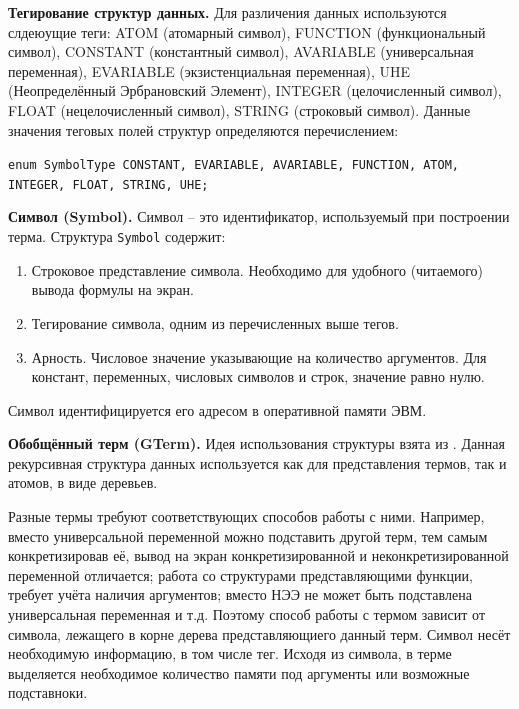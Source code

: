 
\textbf{Тегирование структур данных.} 
Для различения данных используются слдеюущие теги: ATOM (атомарный символ), FUNCTION (функциональный символ), CONSTANT (константный символ), AVARIABLE (универсальная переменная), EVARIABLE (экзистенциальная переменная), UHE (Неопределённый Эрбрановский Элемент), INTEGER (целочисленный символ), FLOAT (нецелочисленный символ), STRING (строковый символ). Данные значения теговых полей структур определяются перечислением:

{\tt enum SymbolType {CONSTANT, EVARIABLE, AVARIABLE, FUNCTION, ATOM, INTEGER, FLOAT, STRING, UHE};}

\textbf{Символ (Symbol).} 
Символ -- это идентификатор, используемый при построении терма. Структура \texttt{Symbol} содержит: 
\begin{enumerate}
\item Строковое представление символа. Необходимо для удобного (читаемого) вывода формулы на экран.
\item Тегирование символа, одним из перечисленных выше тегов. 
\item Арность. Числовое значение указывающие на количество аргументов. Для констант, переменных, числовых символов и строк, значение равно нулю.
\end{enumerate}

Символ идентифицируется его адресом в оперативной памяти ЭВМ.

\textbf{Обобщённый терм (GTerm).} 
Идея использования структуры взята из \cite{NNN}. Данная рекурсивная структура данных используется как для представления термов, так и атомов, в виде деревьев. 

Разные термы требуют соответствующих способов работы с ними. Например, вместо универсальной переменной можно подставить другой терм, тем самым конкретизировав её, вывод на экран конкретизированной и неконкретизированной переменной отличается; работа со структурами представляющими функции, требует учёта наличия аргументов; вместо НЭЭ не может быть подставлена универсальная переменная и т.д. Поэтому способ работы с термом зависит от символа, лежащего в корне дерева представляющиего данный терм. Символ несёт необходимую информацию, в том числе тег. Исходя из символа, в терме выделяется необходимое количество памяти под аргументы или возможные подставноки.  

